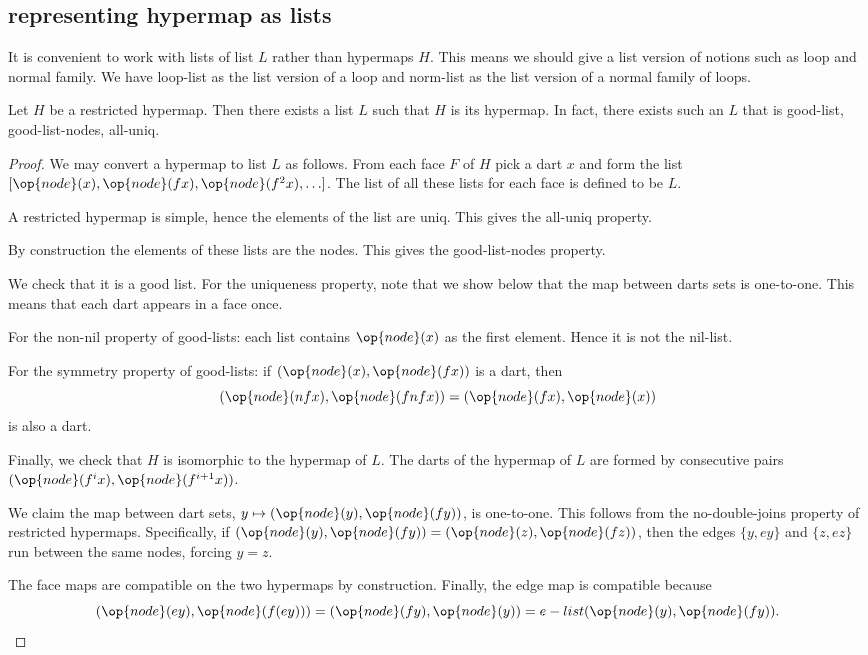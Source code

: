 \subsection{representing hypermap as lists}

It is convenient to work with lists of list $L$ rather than hypermaps $H$.  This means
we should give a list version of notions such as loop and normal family.
We have loop-list as the list version of a loop and norm-list as the list
version of  a normal family of loops.  




\begin{lemma}
Let $H$ be a restricted hypermap.  Then there exists a list $L$ such that $H$ is its hypermap.
In fact, there exists such an $L$ that is good-list, good-list-nodes, all-uniq.
\end{lemma}

\begin{proof} We may convert a hypermap to list $L$ as follows.  From each face $F$ of $H$
pick a dart $x$ and form the list $[\op{node}(x),\op{node}(f x),\op{node}(f^2 x),\ldots]$.  
The list of all these lists for each face is defined to be $L$.

A restricted hypermap is simple, hence the elements of the list are uniq.  This gives the all-uniq property.

By construction the elements of these lists are the nodes.  This gives the good-list-nodes property.

We check that it is a good list.  
For the uniqueness property, note that we show below that the map between darts sets is one-to-one.
This means that each dart appears in a face once.

For the non-nil property of good-lists: each list contains $\op{node}(x)$ as the first element. Hence it is
not the nil-list.

For the symmetry property of good-lists: if $(\op{node}(x),\op{node}(f x))$ is a dart, then
\[
(\op{node}(n f x),\op{node}(f n f x)) = (\op{node}(f x),\op{node}(x))
\]
is also a dart.

Finally, we check that $H$ is isomorphic to the hypermap of $L$.  The darts of the hypermap of $L$ are formed by
consecutive pairs $(\op{node}(f^i x),\op{node}(f^{i+1} x))$.  

We claim the map between dart sets, $y\mapsto (\op{node}(y),\op{node}(f y))$, is one-to-one.
This follows from the no-double-joins property of restricted hypermaps.  Specifically,
if $(\op{node}(y),\op{node}(f y)) = (\op{node}(z),\op{node}(f z))$, then the edges $\{y,e y\}$ and $\{z,ez\}$ run
between the same nodes, forcing $y=z$.

The face maps are compatible on the two hypermaps by construction. Finally, the edge map is compatible because
\[
(\op{node}(e y),\op{node}(f (e y))) = (\op{node}(f y),\op{node}(y)) = e-list (\op{node}(y),\op{node}(f y)).
\]
\end{proof}

